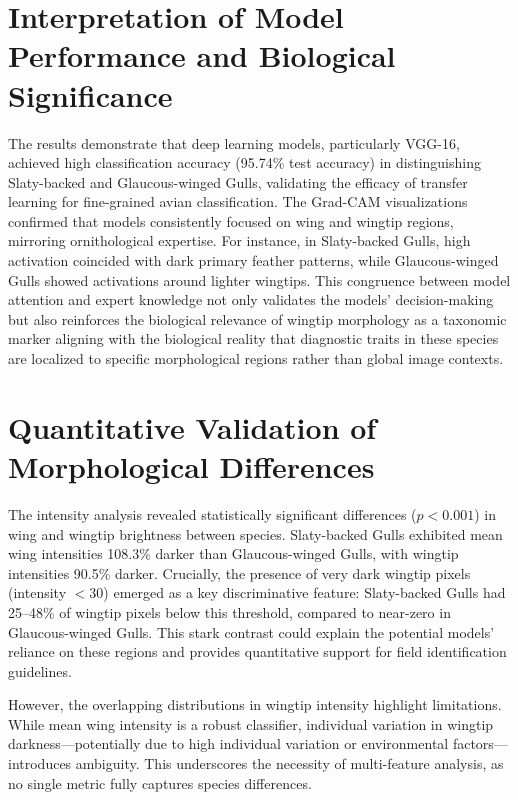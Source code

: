 \documentclass[a4paper,12pt]{report}
\begin{document}
\section{Interpretation of Model Performance and Biological Significance}
The results demonstrate that deep learning models, particularly VGG-16, achieved high classification accuracy (95.74\% test accuracy) in distinguishing Slaty-backed and Glaucous-winged Gulls, validating the efficacy of transfer learning for fine-grained avian classification. The Grad-CAM visualizations confirmed that models consistently focused on wing and wingtip regions, mirroring ornithological expertise. For instance, in Slaty-backed Gulls, high activation coincided with dark primary feather patterns, while Glaucous-winged Gulls showed activations around lighter wingtips. This congruence between model attention and expert knowledge not only validates the models’ decision-making but also reinforces the biological relevance of wingtip morphology as a taxonomic marker aligning with the biological reality that diagnostic traits in these species are localized to specific morphological regions rather than global image contexts.

\section{Quantitative Validation of Morphological Differences}
The intensity analysis revealed statistically significant differences ($p < 0.001$) in wing and wingtip brightness between species. Slaty-backed Gulls exhibited mean wing intensities 108.3\% darker than Glaucous-winged Gulls, with wingtip intensities 90.5\% darker. Crucially, the presence of very dark wingtip pixels (intensity $<30$) emerged as a key discriminative feature: Slaty-backed Gulls had 25–48\% of wingtip pixels below this threshold, compared to near-zero in Glaucous-winged Gulls. This stark contrast could explain the potential models’ reliance on these regions and provides quantitative support for field identification guidelines.

However, the overlapping distributions in wingtip intensity highlight limitations. While mean wing intensity is a robust classifier, individual variation in wingtip darkness---potentially due to high individual variation or environmental factors---introduces ambiguity. This underscores the necessity of multi-feature analysis, as no single metric fully captures species differences.
\end{document}
